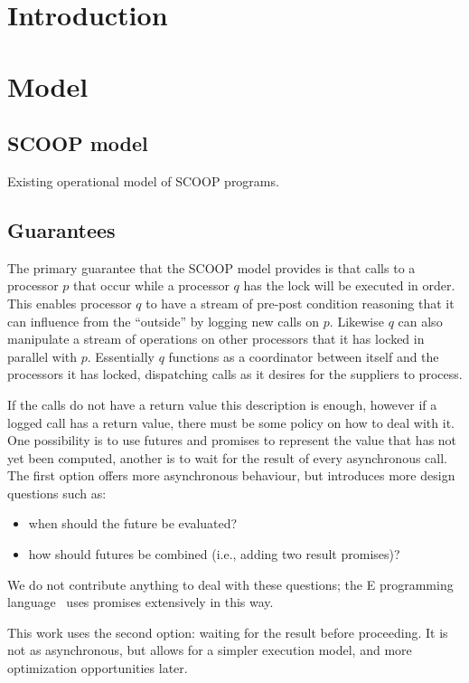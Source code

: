 \documentclass[a4]{article}
\begin{document}
\section{Introduction}

\section{Model}

\subsection{SCOOP model}
Existing operational model of SCOOP programs.

\subsection{Guarantees}

The primary guarantee that the SCOOP model provides is that calls to a
processor $p$ that occur while a processor $q$ has the lock
will be executed in order.
This enables processor $q$ to have
a stream of pre-post condition reasoning that
it can influence from the ``outside'' by logging new calls on $p$.
Likewise $q$ can also manipulate a stream of operations on other
processors that it has locked in parallel with $p$.
Essentially $q$ functions as a coordinator between itself
and the processors it has locked,
dispatching calls as it desires for the suppliers to process.

If the calls do not have a return value this description is enough,
however if a logged call has a return value,
there must be some policy on how to deal with it.
One possibility is to use futures and promises to represent the value that has
not yet been computed,
another is to wait for the result of every asynchronous call.
The first option offers more asynchronous behaviour,
but introduces more design questions such as:

\begin{itemize}
\item when should the future be evaluated?
\item how should futures be combined (i.e., adding two result promises)?
\end{itemize}
We do not contribute anything to deal with these questions;
the E programming language~\cite{miller:2006:robust_composition}
uses promises extensively in this way.

This work uses the second option:
waiting for the result before proceeding.
It is not as asynchronous, but allows for a simpler execution model,
and more optimization opportunities later.
\end{document}
